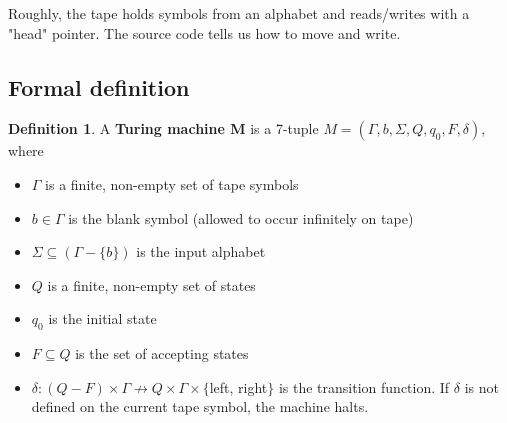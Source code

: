 \documentclass[11pt]{article}
\theoremstyle{plain}
\theoremstyle{definition}
\newtheorem*{defn}{Definition}
\begin{document}
Roughly, the tape holds symbols from an alphabet and reads/writes with a "head" pointer. The source code tells us how to move and write.

\subsection{Formal definition}

\begin{defn}
    A {\bf Turing machine M} is a 7-tuple $M = (\Gamma, b, \Sigma, Q, q_0, F, \delta)$, where
    \begin{itemize}
        \item $\Gamma$ is a finite, non-empty set of tape symbols
        \item $b \in \Gamma$ is the blank symbol (allowed to occur infinitely on tape)
        \item $\Sigma \subseteq (\Gamma - \{b\})$ is the input alphabet 
        \item $Q$ is a finite, non-empty set of states
        \item $q_0$ is the initial state 
        \item $F \subseteq Q$ is the set of accepting states 
        \item $\delta: (Q - F) \times \Gamma \nrightarrow Q \times \Gamma \times \{$left, right$\}$ is the transition function. If $\delta$ 
            is not defined on the current tape symbol, the machine halts.
    \end{itemize}
\end{defn}
\end{document}
